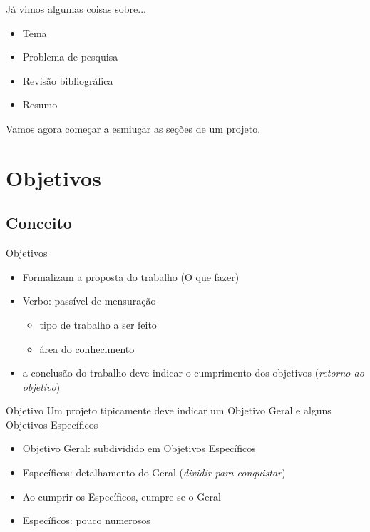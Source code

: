 \documentclass{beamer}
\begin{document}
\begin{frame}{Já vimos algumas coisas sobre...}
  \begin{itemize}
  \item<1-> Tema
  \item<1-> Problema de pesquisa
  \item<1-> Revisão bibliográfica
  \item<1-> Resumo
  \end{itemize}

  Vamos agora começar a esmiuçar as seções de um projeto.
\end{frame}

\section{Objetivos}

\subsection{Conceito}

\begin{frame}{Objetivos}
  \begin{itemize}
  \item Formalizam a proposta do trabalho (\alert{O que} fazer)
  \item \alert{Verbo}: passível de mensuração
    \begin{itemize}
    \item tipo de trabalho a ser feito
    \item área do conhecimento
    \end{itemize}
    \item a conclusão do trabalho deve indicar o cumprimento dos
      objetivos ({\em retorno ao objetivo})
  \end{itemize}
\end{frame}

\begin{frame}{Objetivo}
  Um projeto tipicamente deve indicar um Objetivo Geral e alguns
  Objetivos Específicos
  \begin{itemize}
  \item Objetivo Geral: subdividido em Objetivos Específicos
  \item Específicos: detalhamento do Geral ({\em dividir para conquistar})
  \item Ao cumprir os Específicos, cumpre-se o Geral
  \item Específicos: pouco numerosos
  \end{itemize}
\end{frame}
\end{document}
